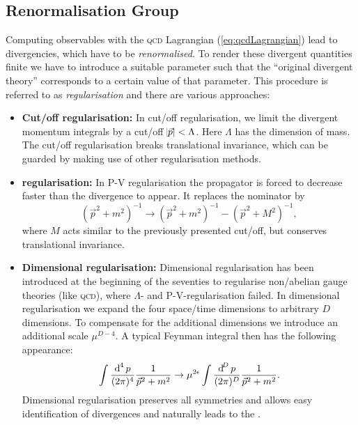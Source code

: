 \documentclass[../../index.tex]{subfiles}
\begin{document}
\subsection{Renormalisation Group}
Computing observables with the \textsc{qcd} Lagrangian (\cref{eq:qcdLagrangian})
lead to divergencies, which have to be \textit{renormalised}. To render these
divergent quantities finite we have to introduce a suitable parameter such that
the ``original divergent theory'' corresponds to a certain value of that
parameter. This procedure is referred to as \textit{regularisation} and there
are various approaches:
\begin{itemize}
\item \label{itm:lambdaRegularisation}\textbf{Cut\-/off regularisation:} In
  cut\-/off regularisation, we limit the divergent momentum integrals by a
  cut\-/off \(\abs{\vec p} < \Lambda\). Here \(\Lambda\) has the dimension of
  mass. The cut\-/off regularisation breaks translational invariance, which can
  be guarded by making use of other regularisation methods.
\item \textbf{ regularisation:} \cite{Pauli1949}
  In \textsc{P-V} regularisation the propagator is forced to decrease faster
  than the divergence to appear. It replaces the nominator by
  \begin{equation}
    (\vec p^2 + m^2)^{-1} \to (\vec p^2 + m^2)^{-1} - (\vec p^2 + M^2)^{-1},
  \end{equation}
  where \(M\) acts similar to the previously presented
  cut\-/off, but conserves translational invariance.
\item \textbf{Dimensional regularisation:}
  \cite{Bollini1972,tHooft1972,tHooft1973} Dimensional regularisation has been
  introduced at the beginning of the seventies to regularise non\-/abelian gauge
  theories (like \textsc{qcd}), where \(\Lambda\)- and
  \textsc{P-V}-regularisation failed. In dimensional regularisation we expand
  the four space\-/time dimensions to arbitrary \(D\) dimensions. To compensate
  for the additional dimensions we introduce an additional scale \(\mu^{D-4}\).
  A typical Feynman integral then has the following appearance:
  \begin{equation}
    \label{eq:dimRegFeynmanIntegral}
    \int \fdif{p} \frac{1}{\vec p^2 + m^2} \to \mu^{2\epsilon} \int \frac{\dif^D p}{(2\pi)^D}\frac{1}{\vec p^2+m^2}.
  \end{equation}
  Dimensional regularisation preserves all symmetries and allows easy
  identification of divergences and naturally leads to the  \cite{tHooft1973,Weinberg1973a}.
\end{itemize}
\end{document}
